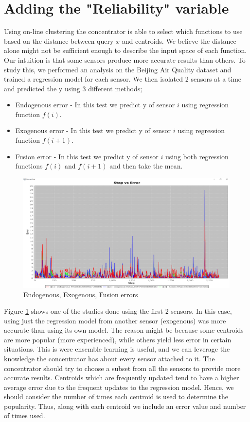 \documentclass{mproj}
\begin{document}
\section{Adding the "Reliability" variable}
\label{sec:reliabilityVariable}
Using on-line clustering the concentrator is able to select which functions to use based on the distance between query $x$ and centroids. We believe the distance alone might not be sufficient enough to describe the input space of each function. Our intuition is that some sensors produce more accurate results than others. To study this, we performed an analysis on the Beijing Air Quality dataset \cite{air-quality-inference-meets-big-data} and trained a regression model for each sensor. We then isolated 2 sensors at a time and predicted the y using 3 different methods; 

\begin{itemize}  
\item Endogenous error - In this test we predict y of sensor $i$ using regression function $f(i)$.
\item Exogenous error - In this test we predict y of sensor $i$ using regression function $f(i+1)$.
\item Fusion error - In this test we predict y of sensor $i$ using both regression functions $f(i)$ and $f(i+1)$ and then take the mean.
\end{itemize}

\begin{figure}[H]
\caption{Endogenous, Exogenous, Fusion errors}
\label{fig:functionsErrors}
\centerline{\includegraphics[scale=0.4]{e1e2e3}}
\end{figure}

Figure \ref{fig:functionsErrors} shows one of the studies done using the first 2 sensors. In this case, using just the regression model from another sensor (exogenous) was more accurate than using its own model. The reason might be because some centroids are more popular (more experienced), while others yield less error in certain situations. This is were ensemble learning is useful, and we can leverage the knowledge the concentrator has about every sensor attached to it. The concentrator should try to choose a subset from all the sensors to provide more accurate results. Centroids which are frequently updated tend to have a higher average error due to the frequent updates to the regression model. Hence, we should consider the number of times each centroid is used to determine the popularity. Thus, along with each centroid we include an error value and number of times used.
\end{document}
